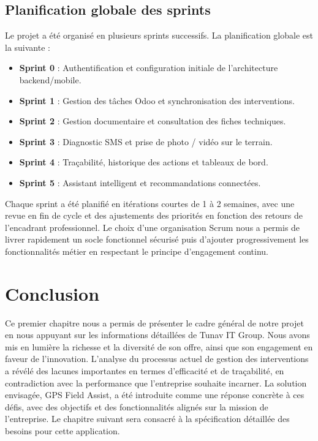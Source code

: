 \documentclass[12pt,a4paper]{report}
\begin{document}
 \subsection{Planification globale des sprints}
 \noindent Le projet a été organisé en plusieurs sprints successifs. La planification globale est la suivante :
 \begin{itemize}
     \item \textbf{Sprint 0} : Authentification et configuration initiale de l'architecture backend/mobile.
     \item \textbf{Sprint 1} : Gestion des tâches Odoo et synchronisation des interventions.
     \item \textbf{Sprint 2} : Gestion documentaire et consultation des fiches techniques.
     \item \textbf{Sprint 3} : Diagnostic SMS et prise de photo / vidéo sur le terrain.
     \item \textbf{Sprint 4} : Traçabilité, historique des actions et tableaux de bord.
     \item \textbf{Sprint 5} : Assistant intelligent et recommandations connectées.
 \end{itemize}
 \noindent Chaque sprint a été planifié en itérations courtes de 1 à 2 semaines, avec une revue en fin de cycle et des ajustements des priorités en fonction des retours de l'encadrant professionnel. Le choix d'une organisation Scrum nous a permis de livrer rapidement un socle fonctionnel sécurisé puis d'ajouter progressivement les fonctionnalités métier en respectant le principe d'engagement continu.

 \section { Conclusion }   
\noindent Ce premier chapitre nous a permis de présenter le cadre général de notre projet en nous appuyant sur les informations détaillées de Tunav IT Group. Nous avons mis en lumière la richesse et la diversité de son offre, ainsi que son engagement en faveur de l'innovation. L'analyse du processus actuel de gestion des interventions a révélé des lacunes importantes en termes d'efficacité et de traçabilité, en contradiction avec la performance que l'entreprise souhaite incarner. La solution envisagée, GPS Field Assist, a été introduite comme une réponse concrète à ces défis, avec des objectifs et des fonctionnalités alignés sur la mission de l'entreprise. Le chapitre suivant sera consacré à la spécification détaillée des besoins pour cette application.
\end{document}
